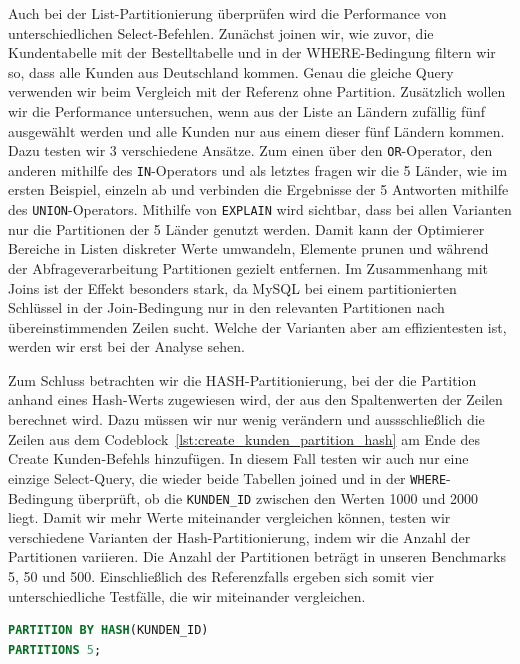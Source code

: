 Auch bei der List-Partitionierung überprüfen wird die Performance von unterschiedlichen Select-Befehlen.
Zunächst joinen wir, wie zuvor, die Kundentabelle mit der Bestelltabelle und in der WHERE-Bedingung filtern wir so, dass alle Kunden aus Deutschland kommen.
Genau die gleiche Query verwenden wir beim Vergleich mit der Referenz ohne Partition.
Zusätzlich wollen wir die Performance untersuchen, wenn aus der Liste an Ländern zufällig fünf ausgewählt werden und alle Kunden nur aus einem dieser fünf Ländern kommen.
Dazu testen wir 3 verschiedene Ansätze.
Zum einen über den \texttt{OR}-Operator, den anderen mithilfe des \texttt{IN}-Operators und als letztes fragen wir die 5 Länder, wie im ersten Beispiel, einzeln ab und verbinden die Ergebnisse der 5 Antworten mithilfe des \texttt{UNION}-Operators.
Mithilfe von \texttt{EXPLAIN} wird sichtbar, dass bei allen Varianten nur die Partitionen der 5 Länder genutzt werden.
Damit kann der Optimierer Bereiche in Listen diskreter Werte umwandeln, Elemente prunen und während der Abfrageverarbeitung Partitionen gezielt entfernen.
Im Zusammenhang mit Joins ist der Effekt besonders stark, da MySQL bei einem partitionierten Schlüssel in der Join-Bedingung nur in den relevanten Partitionen nach übereinstimmenden Zeilen sucht.
Welche der Varianten aber am effizientesten ist, werden wir erst bei der Analyse sehen.

Zum Schluss betrachten wir die HASH-Partitionierung, bei der die Partition anhand eines Hash-Werts zugewiesen wird, der aus den Spaltenwerten der Zeilen berechnet wird.
Dazu müssen wir nur wenig verändern und aussschließlich die Zeilen aus dem Codeblock~\ref{lst:create_kunden_partition_hash} am Ende des Create Kunden-Befehls hinzufügen.
In diesem Fall testen wir auch nur eine einzige Select-Query, die wieder beide Tabellen joined und in der \texttt{WHERE}-Bedingung überprüft, ob die \texttt{KUNDEN\_ID} zwischen den Werten 1000 und 2000 liegt.
Damit wir mehr Werte miteinander vergleichen können, testen wir verschiedene Varianten der Hash-Partitionierung, indem wir die Anzahl der Partitionen variieren.
Die Anzahl der Partitionen beträgt in unseren Benchmarks 5, 50 und 500.
Einschließlich des Referenzfalls ergeben sich somit vier unterschiedliche Testfälle, die wir miteinander vergleichen.

\vspace{-5pt}
\begin{lstlisting}[language=SQL,caption=Hash-Partitonierung,label={lst:create_kunden_partition_hash}]
PARTITION BY HASH(KUNDEN_ID)
PARTITIONS 5;
\end{lstlisting}
\vspace{-5pt}

